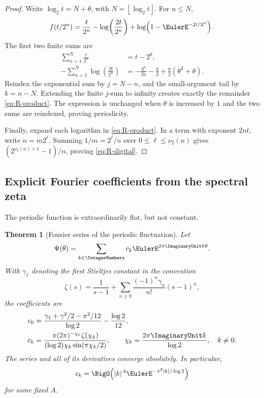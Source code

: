 \documentclass[11pt,oneside]{article}
\newtheorem{theorem}{Theorem}[section]
\theoremstyle{definition}
\theoremstyle{remark}
\begin{document}
\begin{proof}
Write \(\log_2t=N+\theta\), with
\(N=\left\lfloor\log_2t\right\rfloor\).  For \(n\leq N\),
\[
 f(t/2^n)
 =\frac{t}{2^n}
  -\log\!\left(\frac{2t}{2^n}\right)
  +\log\!\left(1-\EulerE^{-2t/2^n}\right).
\]
The first two finite sums are
\begin{align*}
 \sum_{n=1}^{N}\frac{t}{2^n}&=t-2^\theta,\\
 -\sum_{n=1}^{N}\log\!\left(\frac{2t}{2^n}\right)
 &=-\frac{q^2}{2a}-\frac q2+\frac a2(\theta^2+\theta).
\end{align*}
Reindex the exponential sum by \(j=N-n\), and the small-argument tail by
\(k=n-N\).  Extending the finite \(j\)-sum to infinity creates exactly the
remainder \eqref{eq:R-product}.  The expression is unchanged when
\(\theta\) is increased by \(1\) and the two sums are reindexed, proving
periodicity.

Finally, expand each logarithm in \eqref{eq:R-product}.  In a term with
exponent \(2nt\), write \(n=m2^\ell\).  Summing \(1/m=2^\ell/n\) over
\(0\leq\ell\leq\nu_2(n)\) gives
\((2^{\nu_2(n)+1}-1)/n\), proving \eqref{eq:R-digital}.
\end{proof}

\subsection{Explicit Fourier coefficients from the spectral zeta}

The periodic function is extraordinarily flat, but not constant.

\begin{theorem}[Fourier series of the periodic fluctuation]
\label{thm:Psi-Fourier}
Let
\[
 \Psi(\theta)=\sum_{k\in\IntegerNumbers}c_k\EulerE^{2\pi\ImaginaryUnit k\theta}.
\]
With \(\gamma_1\) denoting the first Stieltjes constant in the convention
\[
 \zeta(s)=\frac1{s-1}
 +\sum_{n\geq0}\frac{(-1)^n\gamma_n}{n!}(s-1)^n,
\]
the coefficients are
\begin{align}
 c_0
 &=
 \frac{\gamma_1+\gamma^2/2-\pi^2/12}{\log2}
 -\frac{\log2}{12},
 \label{eq:c0}\\
 c_k
 &=
 \frac{\pi(2\pi)^{-\chi_k}\zeta(\chi_k)}
      {(\log2)\chi_k\sin(\pi\chi_k/2)},
 \qquad
 \chi_k=\frac{2\pi\ImaginaryUnit k}{\log2},
 \quad k\neq0.
 \label{eq:ck}
\end{align}
The series and all of its derivatives converge absolutely.  In particular,
\[
 c_k=\BigO\!\left(
  |k|^A\EulerE^{-\pi^2|k|/\log2}
 \right)
\]
for some fixed \(A\).
\end{theorem}
\end{document}
